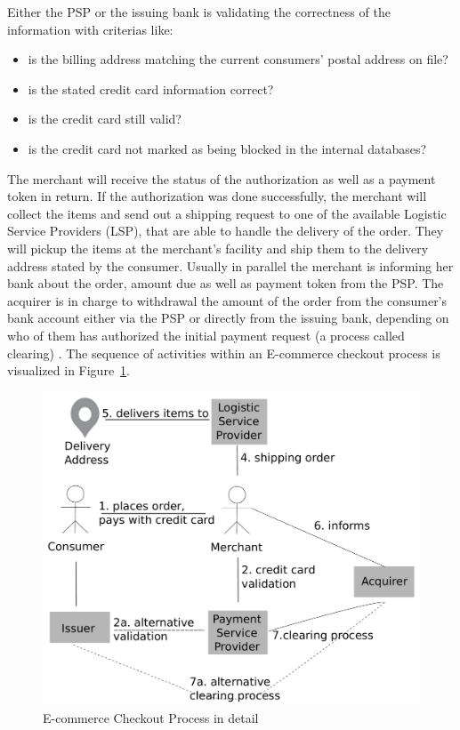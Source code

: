 Either the \gls{PSP} or the issuing bank is validating the correctness of the information with criterias like: \@

\begin{itemize}
    \item is the billing address matching the current consumers' postal address on file?
    \item is the stated credit card information correct?
    \item is the credit card still valid?
    \item is the credit card not marked as being blocked in the internal databases?
\end{itemize}

The merchant will receive the status of the authorization as well as a payment token in return. If the authorization was done successfully, the merchant will collect the items and send out a shipping request to one of the available Logistic Service Providers (\gls{LSP}), that are able to handle the delivery of the order. They will pickup the items at the merchant's facility and ship them to the delivery address stated by the consumer. Usually in parallel the merchant is informing her bank about the order, amount due as well as payment token from the \gls{PSP}. The acquirer is in charge to withdrawal the amount of the order from the consumer's bank account either via the \gls{PSP} or directly from the issuing bank, depending on who of them has authorized the initial payment request (a process called clearing) \citep{VisaPayment2014}. The sequence of activities within an E-commerce checkout process is visualized in Figure~\ref{fig:images_ecommerce_checkout_process}.\@

\begin{figure}[H]
	\centering
		\includegraphics[width=0.8\columnwidth]{images/e-commerce-checkout-process.pdf}
	\caption{E-commerce Checkout Process in detail}
\label{fig:images_ecommerce_checkout_process}
\end{figure}

